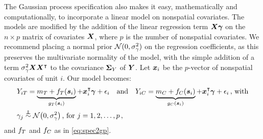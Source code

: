 The Gaussian process specification also makes it easy, mathematically and computationally, to incorporate a linear model on nonspatial covariates.
The models are modified by the addition of the linear regression term \(\bm{X} \bm{\gamma}\) on the \(n \times p\) matrix of covariates \(\bm{X}\), where \(p\) is the number of nonspatial covariates.
We recommend placing a normal prior \(\operatorname{\mathcal{N}}(0,\sigma_{\gamma}^2)\) on the regression coefficients, as this preserves the multivariate normality of the model, with the simple addition of a term \(\sigma_{\gamma}^2 \bm{X} \bm{X}^{\intercal}\) to the covariance \(\bm{\Sigma}_Y\) of \(\bm{Y}\).
Let \(\bm{x}_i\) be the \(p\)-vector of nonspatial covariates of unit \(i\).
Our model becomes:
\begin{equation}
    \begin{split}
        & Y_{i\treat} = \underbrace{m_\treat{} + f_\treat{}(\svec_i)}_{g_\treat{}(\svec_i)} + \xvec_i\trans \gammavec + \epsilon_i \quad\text{and}\quad
        Y_{i\ctrol} = \underbrace{m_\ctrol{} + f_\ctrol{}(\svec_i)}_{g_\ctrol{}(\svec_i)} + \xvec_i\trans \gammavec + \epsilon_i \,\text{, with} \\
        & \gamma_j \overset{\indep}{\sim} \normal\del{0,\sigmabeta^2}\,\text{, for }j=1,2,\dotsc,p \,,
    \end{split}
    \label{eq:covariates_model}
\end{equation}
and \(f_T\) and \(f_C\) as in \autoref{eq:spec2gp}.

